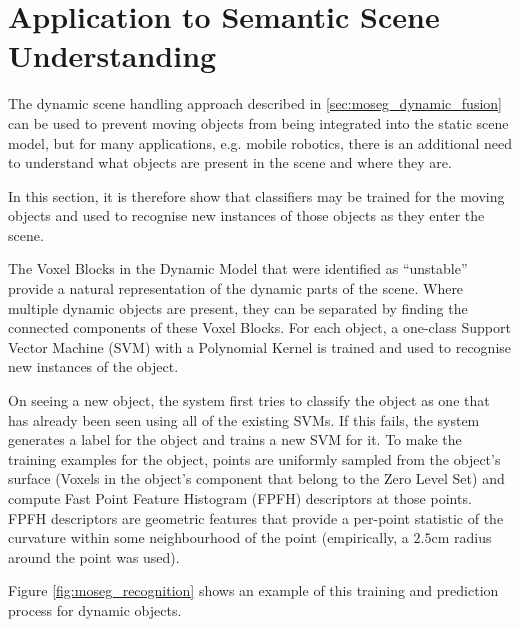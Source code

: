 \section{Application to Semantic Scene Understanding}
\label{sec:moseg_semantic}
The dynamic scene handling approach described in \ref{sec:moseg_dynamic_fusion}
can be used to prevent moving objects from being integrated into the static
scene model, but for many applications, e.g. mobile robotics, there is an
additional need to understand what objects are present in the scene and where
they are.

In this section, it is therefore show that classifiers may be trained for the
moving objects and used to recognise new instances of those objects as they
enter the scene.

The Voxel Blocks in the Dynamic Model that were identified as ``unstable''
provide a natural representation of the dynamic parts of the scene. Where
multiple dynamic objects are present, they can be separated by finding the
connected components of these Voxel Blocks. For each object, a one-class Support
Vector Machine (SVM) with a Polynomial Kernel is trained and used to recognise
new instances of the object.

On seeing a new object, the system first tries to classify the object as one
that has already been seen using all of the existing SVMs. If this fails, the
system generates a label for the object and trains a new SVM for it. To make the
training examples for the object, points are uniformly sampled from the object's
surface (Voxels in the object's component that belong to the Zero Level Set) and
compute Fast Point Feature Histogram (FPFH) descriptors \cite{Rusu2009} 
at those points. FPFH descriptors are geometric features that provide a
per-point statistic of the curvature within some neighbourhood of the point
(empirically, a $2.5$cm radius around the point was used).

Figure \ref{fig:moseg_recognition} shows an example of this training and
prediction process for dynamic objects.

